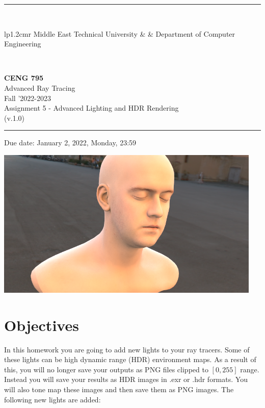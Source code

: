 \documentclass[12pt]{article}
\newcommand{\HRule}{\rule{\linewidth}{1mm}}
\begin{document}
\noindent \HRule \\[3mm]
\small
\begin{tabular}[b]{lp{1.2cm}r}
\href{https://www.metu.edu.tr/}{} Middle East Technical
University &  &
\href{https://ceng.metu.edu.tr/information}{} Department of Computer Engineering \\
\end{tabular} \\
\begin{center}

                 \LARGE \textbf{CENG 795} \\[4mm]
                 \Large Advanced Ray Tracing \\[4mm]
                \normalsize Fall '2022-2023 \\
                    \normalsize Assignment 5 - Advanced Lighting and HDR Rendering\\
                    \normalsize (v.1.0)
\end{center}
\HRule

\begin{center}
Due date: January 2, 2022, Monday, 23:59
\end{center}

\centerline{
    \includegraphics[width=5in]{../outputs/head_env_light.png}
}

\section{Objectives}

In this homework you are going to add new lights to your ray tracers.
Some of these lights can be high dynamic range (HDR) environment maps.
As a result of this, you will no longer save your outputs as PNG files
clipped to $[0, 255]$ range. Instead you will save your results as HDR
images in .exr or .hdr formats. You will also tone map these images and
then save them as PNG images. The following new lights are added:
\end{document}
